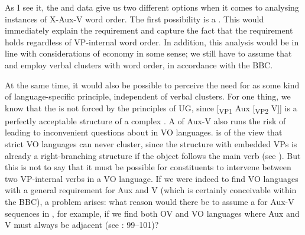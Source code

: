 \documentclass[output=paper, colorlinks, citecolor=brown]{langscibook}
\begin{document}
\ea {}
\label{ex:sangfelt:32}

\z 
\z


As I see it, the  and  data give us two different options when it comes to analysing instances of X-Aux-V word order. The first possibility is a . This would immediately explain the  requirement and capture the fact that the requirement holds regardless of VP-internal word order. In addition, this analysis would be in line with considerations of economy in some sense; we still have to assume that  and  employ verbal clusters with  word order, in accordance with the BBC. 

At the same time, it would also be possible to perceive the need for  as some kind of language-specific principle, independent of verbal clusters. For one thing, we know that the  is not forced by the principles of UG, since [\textsubscript{VP1} Aux [\textsubscript{VP2} V]] is a perfectly acceptable structure of a complex . A  of Aux-V also runs the risk of leading to inconvenient questions about  in VO languages. \citet[343]{Haider2010} is of the view that strict VO languages can never cluster, since the structure with embedded VPs is already a  right-branching structure if the object follows the main verb (see ). But this is not to say that it must be possible for constituents to intervene between two VP-internal verbs in a VO language. If we were indeed to find VO languages with a general  requirement for Aux and V (which is certainly conceivable within the BBC), a problem arises: what reason would there be to assume a  for Aux-V sequences in , for example, if we find both OV and VO languages where Aux and V must always be adjacent (see \citealt{Sheehan2017Final}: 99–101)?
\end{document}
